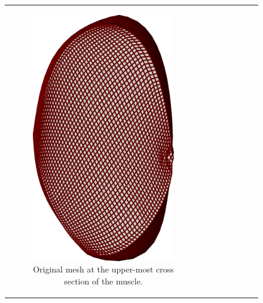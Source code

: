 \begin{figure}
  \centering%
  \begin{tabular}{cc}
    \begin{subfigure}[t]{0.30\textwidth}%
      \centering%
      \includegraphics[width=\textwidth]{images/parallel_fiber_estimation/mesh47_a.png}%
      \caption{Original mesh at the upper-most cross section of the muscle.}%
      \label{fig:mesh47_a}%
    \end{subfigure}
    &
    \begin{subfigure}[t]{0.30\textwidth}%

\end{subfigure}
\end{tabular}
\end{figure}
